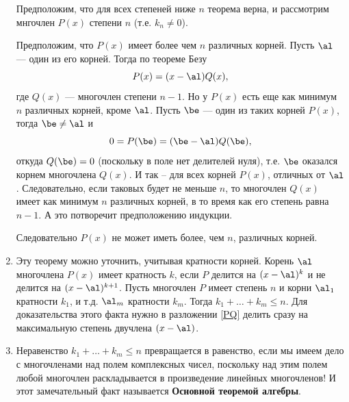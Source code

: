 \begin{enumerate}
Предположим, что для всех степеней ниже $n$ теорема верна, и рассмотрим мнгочлен $P(x)$ степени $n$ (т.е. $k_n\ne 0$).

Предположим, что $P(x)$ имеет более чем $n$ различных корней. Пусть $\al$ --- один из его корней. Тогда по теореме Безу
\begin{equation}\label{PQ}
P(x)=(x-\al)Q(x),
\end{equation}
где $Q(x)$ --- многочлен степени $n-1$. Но у $P(x)$ есть еще как минимум $n$ различных корней, кроме $\al$. Пусть $\be$ --- один из таких корней $P(x)$, тогда $\be\ne\al$ и
$$
0=P(\be)=(\be-\al)Q(\be),
$$
откуда $Q(\be)=0$ (поскольку в поле нет делителей нуля),
т.е. $\be$ оказался корнем многочлена $Q(x)$. И так -- для всех корней $P(x)$, отличных от $\al$. Следовательно, если таковых будет не меньше $n$, то многочлен $Q(x)$ имеет как минимум $n$ различных корней, в то время как его степень равна $n-1$. А это потворечит предположению индукции.

Следовательно $P(x)$ не может иметь более, чем $n$, различных корней.
\epf

\item Эту теорему можно уточнить, учитывая кратности корней. Корень $\al$ многочлена $P(x)$ имеет кратность $k$, если $P$ делится на $(x-\al)^k$ и не делится на $(x-\al)^{k+1}$. Пусть многочлен $P$ имеет степень $n$ и корни $\al_1$ кратности $k_1$, и т.д. $\al_m$ кратности $k_m$. Тогда $k_1+\dots+k_m\le n$. Для доказательства этого факта нужно в разложении \eqref{PQ} делить сразу на максимальную степень двучлена $(x-\al)$.
\item Неравенство $k_1+\dots+k_m\le n$ превращается в равенство, если мы имеем дело с многочленами над полем комплексных чисел, поскольку над этим полем любой многочлен раскладывается в произведение линейных многочленов! И этот замечательный факт называется \textbf{Основной теоремой алгебры}.





\end{enumerate}

